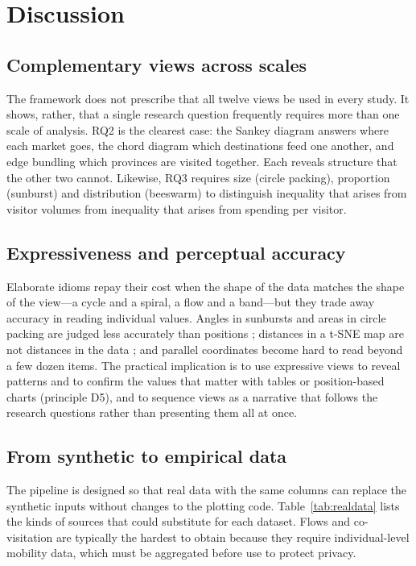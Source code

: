 \documentclass[11pt,a4paper]{article}
\begin{document}
\section{Discussion}\label{sec:discussion}

\subsection{Complementary views across scales}
The framework does not prescribe that all twelve views be used in every study. It shows, rather, that a single
research question frequently requires more than one scale of analysis. RQ2 is the clearest case: the Sankey
diagram answers where each market goes, the chord diagram which destinations feed one another, and edge
bundling which provinces are visited together. Each reveals structure that the other two cannot. Likewise, RQ3
requires size (circle packing), proportion (sunburst) and distribution (beeswarm) to distinguish inequality
that arises from visitor volumes from inequality that arises from spending per visitor.

\subsection{Expressiveness and perceptual accuracy}
Elaborate idioms repay their cost when the shape of the data matches the shape of the view---a cycle and a
spiral, a flow and a band---but they trade away accuracy in reading individual values. Angles in sunbursts and
areas in circle packing are judged less accurately than positions \citep{cleveland1984}; distances in a t-SNE
map are not distances in the data \citep{wattenberg2016}; and parallel coordinates become hard to read beyond a
few dozen items. The practical implication is to use expressive views to reveal patterns and to confirm the
values that matter with tables or position-based charts (principle D5), and to sequence views as a narrative
that follows the research questions \citep{segel2010} rather than presenting them all at once.

\subsection{From synthetic to empirical data}
The pipeline is designed so that real data with the same columns can replace the synthetic inputs without
changes to the plotting code. Table~\ref{tab:realdata} lists the kinds of sources that could substitute for
each dataset. Flows and co-visitation are typically the hardest to obtain because they require individual-level
mobility data, which must be aggregated before use to protect privacy.
\end{document}
